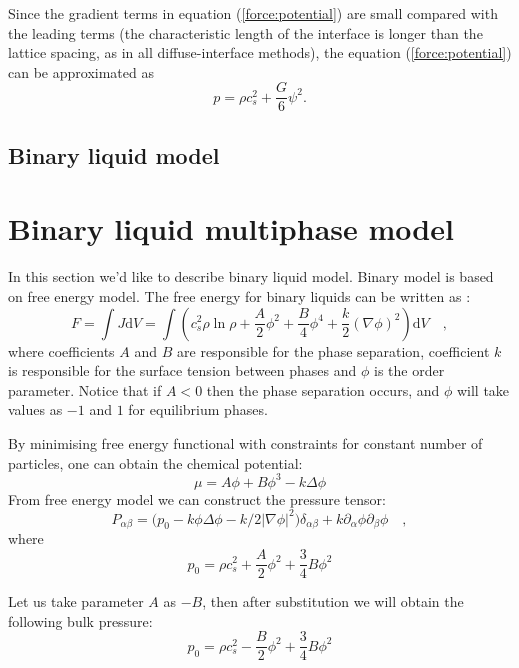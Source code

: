 \documentclass[mathpazo]{cicp}
\begin{document}
Since the gradient terms in equation (\ref{force:potential}) are small compared with the leading terms (the characteristic length of the interface is longer than the lattice spacing, as in
all diffuse-interface methods), the equation (\ref{force:potential}) can be approximated as
\begin{equation}
p=\rho c_s^2+\frac{G}{6}\psi^2.
\end{equation}

\subsection{Binary liquid model}
\section{Binary liquid multiphase model}
In this section we'd like to describe binary liquid model. Binary model is based on free energy model. The free energy for binary liquids can be written as \cite{swift,landau}:
\begin{equation}
F=\int{J \mathrm{d}V}=\int{\left(c_s^2\rho\ln\rho+\frac{A}{2}\phi^2+\frac{B}{4}\phi^4 + \frac{k}{2}(\nabla \phi)^2 \right)\mathrm{d}V} \quad,
\end{equation}
where coefficients $A$ and $B$ are responsible for the phase separation, coefficient $k$ is responsible for the surface tension between phases and $\phi$ is the order parameter. Notice that if $A<0$ then the phase separation occurs, and $\phi$ will take values as $-1$ and $1$ for equilibrium phases.

By minimising free energy functional with constraints for constant number of particles, one can obtain the chemical potential:
\begin{equation}
\mu=A\phi+B\phi^3 - k \Delta \phi
\end{equation}
From free energy model we can construct the pressure tensor:
\begin{equation}
P_{\alpha \beta}=\bigg(p_0 - k\phi\Delta\phi-k/2 |\nabla \phi|^2\bigg)\delta_{\alpha\beta}+k\partial_{\alpha}\phi\partial_{\beta}\phi \quad,
\end{equation}
where
\begin{equation}
 p_0=\rho c_s^2+\frac{A}{2}\phi^2+\frac{3}{4}B \phi^2
\label{binary:bulk:pressure}
\end{equation}

Let us take parameter $A$ as $-B$, then after substitution we will obtain the following bulk pressure:
\begin{equation}
 p_0=\rho c_s^2-\frac{B}{2}\phi^2+\frac{3}{4}B \phi^2
\end{equation}
\end{document}
